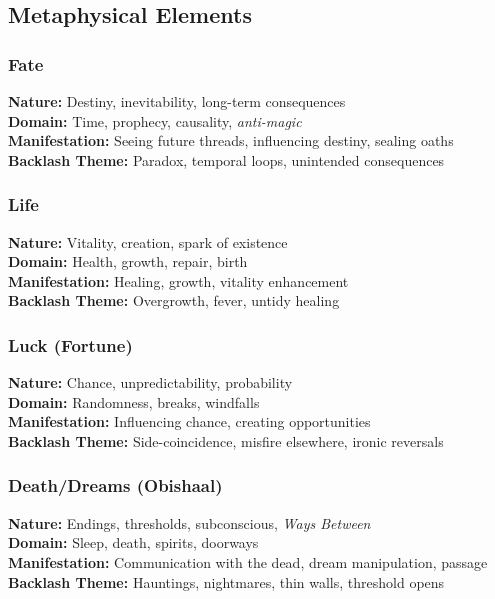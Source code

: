 \subsection{Metaphysical Elements}

\subsubsection{Fate}
\textbf{Nature:} Destiny, inevitability, long-term consequences\\
\textbf{Domain:} Time, prophecy, causality, \emph{anti-magic}\\
\textbf{Manifestation:} Seeing future threads, influencing destiny, sealing oaths\\
\textbf{Backlash Theme:} Paradox, temporal loops, unintended consequences

\subsubsection{Life}
\textbf{Nature:} Vitality, creation, spark of existence\\
\textbf{Domain:} Health, growth, repair, birth\\
\textbf{Manifestation:} Healing, growth, vitality enhancement\\
\textbf{Backlash Theme:} Overgrowth, fever, untidy healing

\subsubsection{Luck (Fortune)}
\textbf{Nature:} Chance, unpredictability, probability\\
\textbf{Domain:} Randomness, breaks, windfalls\\
\textbf{Manifestation:} Influencing chance, creating opportunities\\
\textbf{Backlash Theme:} Side-coincidence, misfire elsewhere, ironic reversals

\subsubsection{Death/Dreams (Obishaal)}
\textbf{Nature:} Endings, thresholds, subconscious, \emph{Ways Between}\\
\textbf{Domain:} Sleep, death, spirits, doorways\\
\textbf{Manifestation:} Communication with the dead, dream manipulation, passage\\
\textbf{Backlash Theme:} Hauntings, nightmares, thin walls, threshold opens

